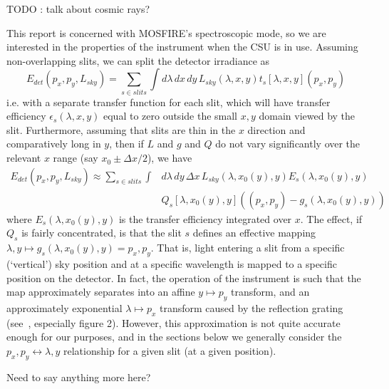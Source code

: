 TODO : talk about cosmic rays?

This report is concerned with MOSFIRE's spectroscopic mode, so we are interested
in the properties of the instrument when the CSU is in use. Assuming non-overlapping
slits, we can split the detector irradiance as
\[
E_{det}(p_x, p_y, L_{sky}) = \sum_{s \in slits} \int d\lambda\, dx\, dy\, L_{sky}(\lambda, x, y) t_s[\lambda, x, y](p_x, p_y)
\]
i.e. with a separate transfer function for each slit, which will have
transfer efficiency $\epsilon_s (\lambda, x, y)$ equal to zero outside
the small $x,y$ domain viewed by the slit. Furthermore, assuming that
slits are thin in the $x$ direction and comparatively long in $y$, then
if $L$ and $g$ and $Q$ do not vary significantly over the relevant $x$
range (say $x_0 \pm \Delta x / 2$), we have
\begin{align*}
E_{det}(p_x, p_y, L_{sky}) \approx
\sum_{s \in slits} \int &d\lambda\, dy\, \Delta x\, L_{sky}(\lambda, x_0(y), y)
E_s(\lambda, x_0(y), y) \\
& Q_s[\lambda, x_0(y), y]((p_x, p_y) - g_s (\lambda, x_0(y), y))
\end{align*}
where $E_s(\lambda, x_0(y), y)$ is the transfer efficiency integrated
over $x$. The effect, if $Q_s$ is fairly concentrated, is that the slit
$s$ defines an effective mapping $\lambda, y \mapsto g_s (\lambda,
x_0(y), y) = p_x, p_y$. That is, light entering a slit from a specific
(`vertical') sky position and at a specific wavelength is mapped to
a specific position on the detector. In fact, the operation of the
instrument is such that the map approximately separates into an affine
$y \mapsto p_y$ transform, and an approximately exponential $\lambda
\mapsto p_x$ transform caused by the reflection grating (see~\cite{surfreport},
especially figure 2). However, this approximation is not quite accurate
enough for our purposes, and in the sections below we generally
consider the $p_x, p_y \leftrightarrow \lambda, y$ relationship for a given
slit (at a given position).

Need to say anything more here?
